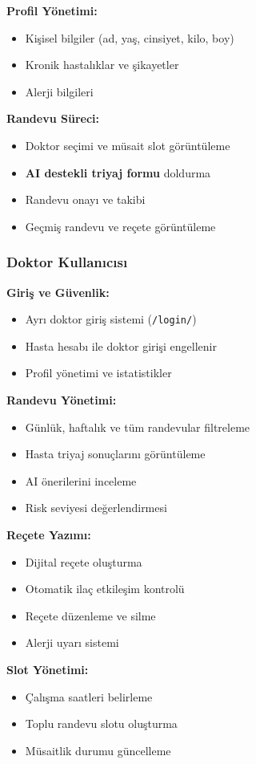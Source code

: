 \documentclass[12pt,a4paper]{article}
\begin{document}
\textbf{Profil Yönetimi:}
\begin{itemize}
    \item Kişisel bilgiler (ad, yaş, cinsiyet, kilo, boy)
    \item Kronik hastalıklar ve şikayetler
    \item Alerji bilgileri
\end{itemize}

\textbf{Randevu Süreci:}
\begin{itemize}
    \item Doktor seçimi ve müsait slot görüntüleme
    \item \textbf{AI destekli triyaj formu} doldurma
    \item Randevu onayı ve takibi
    \item Geçmiş randevu ve reçete görüntüleme
\end{itemize}

\subsubsection{Doktor Kullanıcısı}
\textbf{Giriş ve Güvenlik:}
\begin{itemize}
    \item Ayrı doktor giriş sistemi (\texttt{/login/})
    \item Hasta hesabı ile doktor girişi engellenir
    \item Profil yönetimi ve istatistikler
\end{itemize}

\textbf{Randevu Yönetimi:}
\begin{itemize}
    \item Günlük, haftalık ve tüm randevular filtreleme
    \item Hasta triyaj sonuçlarını görüntüleme
    \item AI önerilerini inceleme
    \item Risk seviyesi değerlendirmesi
\end{itemize}

\textbf{Reçete Yazımı:}
\begin{itemize}
    \item Dijital reçete oluşturma
    \item Otomatik ilaç etkileşim kontrolü
    \item Reçete düzenleme ve silme
    \item Alerji uyarı sistemi
\end{itemize}

\textbf{Slot Yönetimi:}
\begin{itemize}
    \item Çalışma saatleri belirleme
    \item Toplu randevu slotu oluşturma
    \item Müsaitlik durumu güncelleme
\end{itemize}
\end{document}
